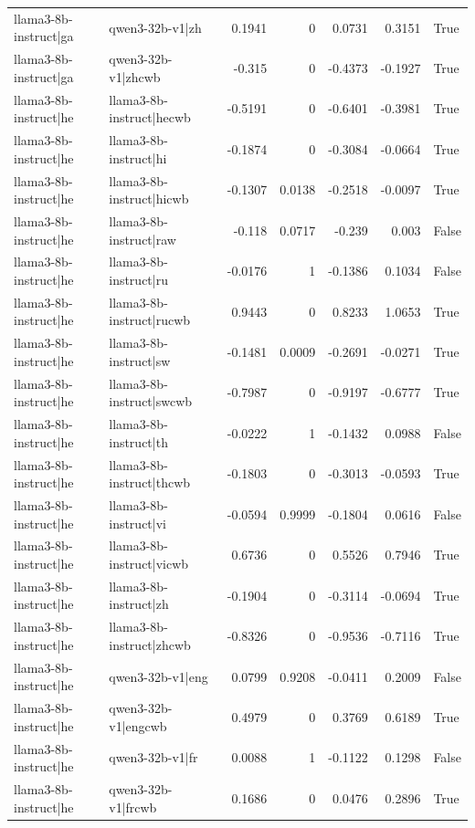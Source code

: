 \begin{table}
\begin{tabular}{l l r r r r l}
llama3-8b-instruct|ga & qwen3-32b-v1|zh & 0.1941 & 0 & 0.0731 & 0.3151 & True \\
llama3-8b-instruct|ga & qwen3-32b-v1|zhcwb & -0.315 & 0 & -0.4373 & -0.1927 & True \\
llama3-8b-instruct|he & llama3-8b-instruct|hecwb & -0.5191 & 0 & -0.6401 & -0.3981 & True \\
llama3-8b-instruct|he & llama3-8b-instruct|hi & -0.1874 & 0 & -0.3084 & -0.0664 & True \\
llama3-8b-instruct|he & llama3-8b-instruct|hicwb & -0.1307 & 0.0138 & -0.2518 & -0.0097 & True \\
llama3-8b-instruct|he & llama3-8b-instruct|raw & -0.118 & 0.0717 & -0.239 & 0.003 & False \\
llama3-8b-instruct|he & llama3-8b-instruct|ru & -0.0176 & 1 & -0.1386 & 0.1034 & False \\
llama3-8b-instruct|he & llama3-8b-instruct|rucwb & 0.9443 & 0 & 0.8233 & 1.0653 & True \\
llama3-8b-instruct|he & llama3-8b-instruct|sw & -0.1481 & 0.0009 & -0.2691 & -0.0271 & True \\
llama3-8b-instruct|he & llama3-8b-instruct|swcwb & -0.7987 & 0 & -0.9197 & -0.6777 & True \\
llama3-8b-instruct|he & llama3-8b-instruct|th & -0.0222 & 1 & -0.1432 & 0.0988 & False \\
llama3-8b-instruct|he & llama3-8b-instruct|thcwb & -0.1803 & 0 & -0.3013 & -0.0593 & True \\
llama3-8b-instruct|he & llama3-8b-instruct|vi & -0.0594 & 0.9999 & -0.1804 & 0.0616 & False \\
llama3-8b-instruct|he & llama3-8b-instruct|vicwb & 0.6736 & 0 & 0.5526 & 0.7946 & True \\
llama3-8b-instruct|he & llama3-8b-instruct|zh & -0.1904 & 0 & -0.3114 & -0.0694 & True \\
llama3-8b-instruct|he & llama3-8b-instruct|zhcwb & -0.8326 & 0 & -0.9536 & -0.7116 & True \\
llama3-8b-instruct|he & qwen3-32b-v1|eng & 0.0799 & 0.9208 & -0.0411 & 0.2009 & False \\
llama3-8b-instruct|he & qwen3-32b-v1|engcwb & 0.4979 & 0 & 0.3769 & 0.6189 & True \\
llama3-8b-instruct|he & qwen3-32b-v1|fr & 0.0088 & 1 & -0.1122 & 0.1298 & False \\
llama3-8b-instruct|he & qwen3-32b-v1|frcwb & 0.1686 & 0 & 0.0476 & 0.2896 & True \\

\end{tabular}
\end{table}
